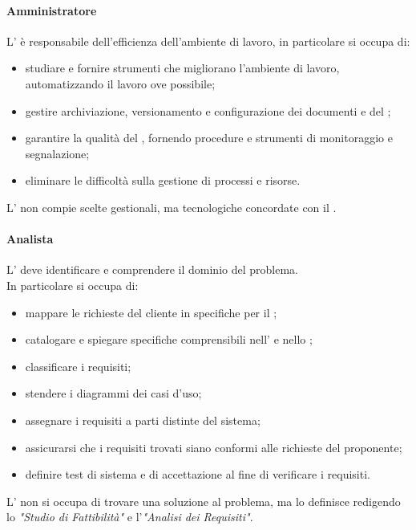  \paragraph{Amministratore}
 L'\AMM{} è responsabile dell'efficienza dell'ambiente di lavoro, in particolare si occupa di:
 \begin{itemize}
  \item studiare e fornire strumenti che migliorano l'ambiente di lavoro, automatizzando il lavoro ove possibile;
  \item gestire archiviazione, versionamento e configurazione dei documenti e del ;
  \item garantire la qualità del , fornendo procedure e strumenti di monitoraggio e segnalazione;
  \item eliminare le difficoltà sulla gestione di processi e risorse.
 \end{itemize}
 L'\AMM{} non compie scelte gestionali, ma tecnologiche concordate con il \RESP.
 \paragraph{Analista}
 L'\AN{} deve identificare e comprendere il dominio del problema. \\
 In particolare si occupa di:
 \begin{itemize}
  \item mappare le richieste del cliente in specifiche per il ;
  \item catalogare e spiegare specifiche comprensibili nell'\ARdoc{} e nello \SFdoc{};
  \item classificare i requisiti;
  \item stendere i diagrammi dei casi d'uso;
  \item assegnare i requisiti a parti distinte del sistema;
  \item assicurarsi che i requisiti trovati siano conformi alle richieste del proponente;
  \item definire test di sistema e di accettazione al fine di verificare i requisiti.
\end{itemize}
L'\AN{} non si occupa di trovare una soluzione al problema, ma lo definisce redigendo lo \textit{"Studio di Fattibilità"} e l'\textit{"Analisi dei Requisiti"}. 

